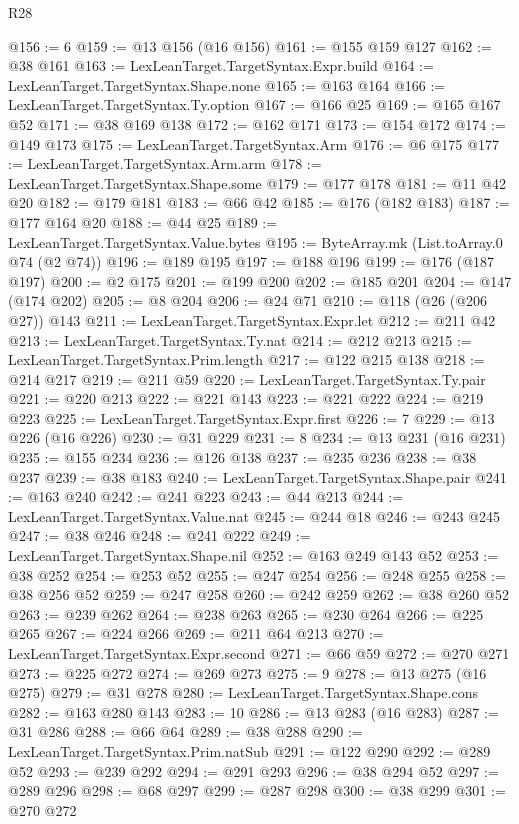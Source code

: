 \begin{lexlean}{R28}
\begin{coremodule}
@156 := 6
@159 := @13 @156 (@16 @156)
@161 := @155 @159 @127
@162 := @38 @161
@163 := LexLeanTarget.TargetSyntax.Expr.build
@164 := LexLeanTarget.TargetSyntax.Shape.none
@165 := @163 @164
@166 := LexLeanTarget.TargetSyntax.Ty.option
@167 := @166 @25
@169 := @165 @167 @52
@171 := @38 @169 @138
@172 := @162 @171
@173 := @154 @172
@174 := @149 @173
@175 := LexLeanTarget.TargetSyntax.Arm
@176 := @6 @175
@177 := LexLeanTarget.TargetSyntax.Arm.arm
@178 := LexLeanTarget.TargetSyntax.Shape.some
@179 := @177 @178
@181 := @11 @42 @20
@182 := @179 @181
@183 := @66 @42
@185 := @176 (@182 @183)
@187 := @177 @164 @20
@188 := @44 @25
@189 := LexLeanTarget.TargetSyntax.Value.bytes
@195 := ByteArray.mk (List.toArray.{0} @74 (@2 @74))
@196 := @189 @195
@197 := @188 @196
@199 := @176 (@187 @197)
@200 := @2 @175
@201 := @199 @200
@202 := @185 @201
@204 := @147 (@174 @202)
@205 := @8 @204
@206 := @24 @71
@210 := @118 (@26 (@206 @27)) @143
@211 := LexLeanTarget.TargetSyntax.Expr.let
@212 := @211 @42
@213 := LexLeanTarget.TargetSyntax.Ty.nat
@214 := @212 @213
@215 := LexLeanTarget.TargetSyntax.Prim.length
@217 := @122 @215 @138
@218 := @214 @217
@219 := @211 @59
@220 := LexLeanTarget.TargetSyntax.Ty.pair
@221 := @220 @213
@222 := @221 @143
@223 := @221 @222
@224 := @219 @223
@225 := LexLeanTarget.TargetSyntax.Expr.first
@226 := 7
@229 := @13 @226 (@16 @226)
@230 := @31 @229
@231 := 8
@234 := @13 @231 (@16 @231)
@235 := @155 @234
@236 := @126 @138
@237 := @235 @236
@238 := @38 @237
@239 := @38 @183
@240 := LexLeanTarget.TargetSyntax.Shape.pair
@241 := @163 @240
@242 := @241 @223
@243 := @44 @213
@244 := LexLeanTarget.TargetSyntax.Value.nat
@245 := @244 @18
@246 := @243 @245
@247 := @38 @246
@248 := @241 @222
@249 := LexLeanTarget.TargetSyntax.Shape.nil
@252 := @163 @249 @143 @52
@253 := @38 @252
@254 := @253 @52
@255 := @247 @254
@256 := @248 @255
@258 := @38 @256 @52
@259 := @247 @258
@260 := @242 @259
@262 := @38 @260 @52
@263 := @239 @262
@264 := @238 @263
@265 := @230 @264
@266 := @225 @265
@267 := @224 @266
@269 := @211 @64 @213
@270 := LexLeanTarget.TargetSyntax.Expr.second
@271 := @66 @59
@272 := @270 @271
@273 := @225 @272
@274 := @269 @273
@275 := 9
@278 := @13 @275 (@16 @275)
@279 := @31 @278
@280 := LexLeanTarget.TargetSyntax.Shape.cons
@282 := @163 @280 @143
@283 := 10
@286 := @13 @283 (@16 @283)
@287 := @31 @286
@288 := @66 @64
@289 := @38 @288
@290 := LexLeanTarget.TargetSyntax.Prim.natSub
@291 := @122 @290
@292 := @289 @52
@293 := @239 @292
@294 := @291 @293
@296 := @38 @294 @52
@297 := @289 @296
@298 := @68 @297
@299 := @287 @298
@300 := @38 @299
@301 := @270 @272

\end{coremodule}
\end{lexlean}
